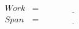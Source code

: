 \begin{align*}
Work & = & \underline{~~~~~~~~~~~~~~~~~~~~~~~~~~~~~}
\\[4mm]
Span & = & \underline{~~~~~~~~~~~~~~~~~~~~~~~~~~~~~}
\end{align*}
